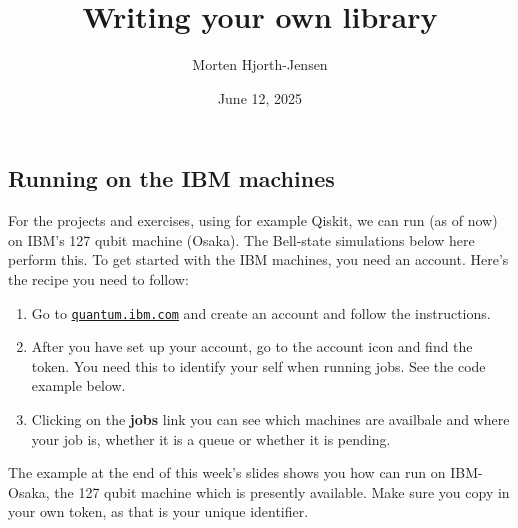 \documentclass[%
oneside,                 %
final,                   %
10pt]{article}
\begin{document}

\newcommand{\exercisesection}[1]{\subsection*{#1}}






\title{Writing your own library}


\author{Morten Hjorth-Jensen}

\date{June 12, 2025
}

\subsection{Running on the IBM machines}

For the projects and exercises, using for example Qiskit, we can run (as of now) on IBM's 127 qubit machine (Osaka).
The Bell-state simulations below here perform this. To get started with the IBM machines, you need an account. Here's the recipe you need to follow:
\begin{enumerate}
\item Go to \href{{quantum.ibm.com}}{\nolinkurl{quantum.ibm.com}} and create an account and follow the instructions.

\item After you have set up your account, go to the account icon and find the token. You need this to identify your self when running jobs. See the code example below.

\item Clicking on the \textbf{jobs} link you can see which machines are availbale and where your job is, whether it is a queue or whether it is pending.
\end{enumerate}

\noindent
The example at the end of this week's slides shows you how can run on IBM-Osaka, the 127 qubit machine which is presently available.
Make sure you copy in your own token,  as that is your unique identifier.
\end{document}
